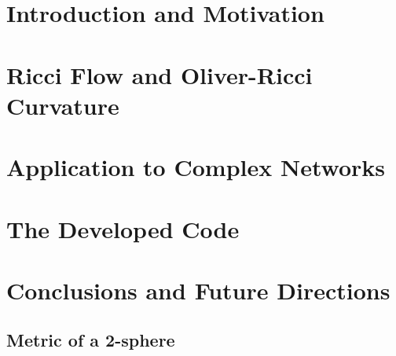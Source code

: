 \documentclass[a4paper,12pt,twoside,online,customfont,custombib,PageStyleI]{Settings/PhDThesisPSnPDF}
\begin{document}
\chapter{Introduction and Motivation}





\chapter{Ricci Flow and Oliver-Ricci Curvature}



\chapter{Application to Complex Networks}



\chapter{The Developed Code}




\chapter{Conclusions and Future Directions}

\begin{appendices} %
\chapter{Metric of a 2-sphere}

\end{appendices}
\end{document}
